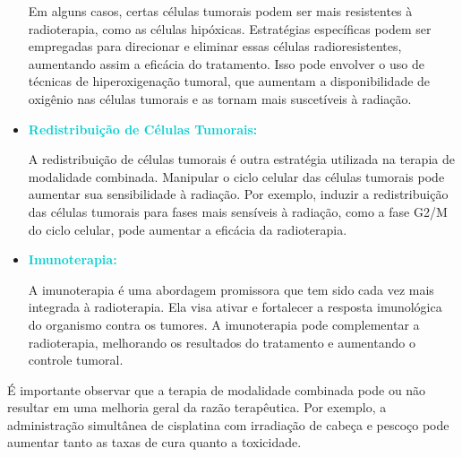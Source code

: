 \documentclass[11pt,a4paper]{article}
\newcounter{exemplo}
\begin{document}
\begin{itemize}[label=\textcolor{CarnationPink}{$\blacktriangleright$}]
		Em alguns casos, certas células tumorais podem ser mais resistentes à radioterapia, como as células hipóxicas. Estratégias específicas podem ser empregadas para direcionar e eliminar essas células radioresistentes, aumentando assim a eficácia do tratamento. Isso pode envolver o uso de técnicas de hiperoxigenação tumoral, que aumentam a disponibilidade de oxigênio nas células tumorais e as tornam mais suscetíveis à radiação.

		\item \textcolor{DarkTurquoise}{\textbf{Redistribuição de Células Tumorais:}}
		
		A redistribuição de células tumorais é outra estratégia utilizada na terapia de modalidade combinada. Manipular o ciclo celular das células tumorais pode aumentar sua sensibilidade à radiação. Por exemplo, induzir a redistribuição das células tumorais para fases mais sensíveis à radiação, como a fase G2/M do ciclo celular, pode aumentar a eficácia da radioterapia.

		\item \textcolor{DarkTurquoise}{\textbf{Imunoterapia:}}  
		
		A imunoterapia é uma abordagem promissora que tem sido cada vez mais integrada à radioterapia. Ela visa ativar e fortalecer a resposta imunológica do organismo contra os tumores. A imunoterapia pode complementar a radioterapia, melhorando os resultados do tratamento e aumentando o controle tumoral.

	\end{itemize}

	É importante observar que a terapia de modalidade combinada pode ou não resultar em uma melhoria geral da razão terapêutica. Por exemplo, a administração simultânea de cisplatina com irradiação de cabeça e pescoço pode aumentar tanto as taxas de cura quanto a toxicidade. 


\end{document}
